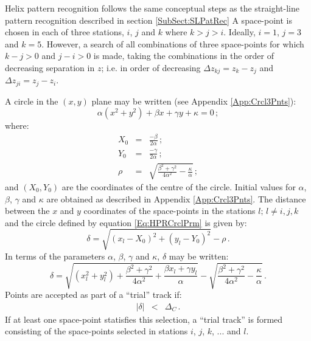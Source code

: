 Helix pattern recognition follows the same conceptual steps as the
straight-line pattern recognition described in section
\ref{SubSect:SLPatRec}
A space-point is chosen in each of three stations, $i$, $j$ and $k$
where $k>j>i$.
Ideally, $i=1$, $j=3$ and $k=5$.
However, a search of all combinations of three space-points for which
$k-j>0$ and $j-i>0$ is made, taking the combinations in the order of
decreasing separation in $z$; 
i.e. in order of decreasing $\Delta z_{kj} = z_k - z_j$ and
$\Delta z_{ji} = z_j - z_i$. 

A circle in the $(x, y)$ plane may be written (see Appendix
\ref{App:Crcl3Pnts}):
\begin{equation}
  \alpha(x^2+y^2) + \beta x + \gamma y + \kappa = 0 \, ;
  \label{Eq:HPRCrclPrm}
\end{equation}
where:
\begin{eqnarray}
  X_0 & = & \frac{-\beta}{2 \alpha}                    \, ; \\
  Y_0 & = & \frac{-\gamma}{2 \alpha}                   \, ; \\
  \rho   & = & \sqrt{
                  \frac{\beta^2 + \gamma^2}{4 \alpha^2}
                  - \frac{\kappa}{\alpha}
                  } \, ;
\end{eqnarray}
and $(X_0, Y_0)$ are the coordinates of the centre of the circle.
Initial values for $\alpha$, $\beta$, $\gamma$ and $\kappa$ are
obtained as described in Appendix \ref{App:Crcl3Pnts}.
The distance between the $x$ and $y$ coordinates of the space-points
in the stations $l;\,l \ne i, j, k$ and the circle defined by equation
\ref{Eq:HPRCrclPrm} is given by:
\begin{equation}
  \delta = \sqrt{(x_l-X_0)^2 + (y_l-Y_0)^2} - \rho \,.
\end{equation}
In terms of the parameters $\alpha$, $\beta$, $\gamma$ and $\kappa$,
$\delta$ may be written:
\begin{equation}
  \delta = \sqrt{(x_l^2 + y_l^2)                       + 
                 \frac{\beta^2 + \gamma^2}{4 \alpha^2} +
                 \frac{\beta x_l + \gamma y_l}{\alpha}
           }                                            - 
           \sqrt{
                  \frac{\beta^2 + \gamma^2}{4 \alpha^2}
                  - \frac{\kappa}{\alpha}
                  }                                      \,.
\end{equation}
Points are accepted as part of a ``trial'' track if:
\begin{eqnarray}
  | \delta | & < & \Delta_C \, .
\end{eqnarray}
If at least one space-point statisfies this selection, a ``trial track''
is formed consisting of the space-points selected in stations 
$i$, $j$, $k$, ... and $l$.

